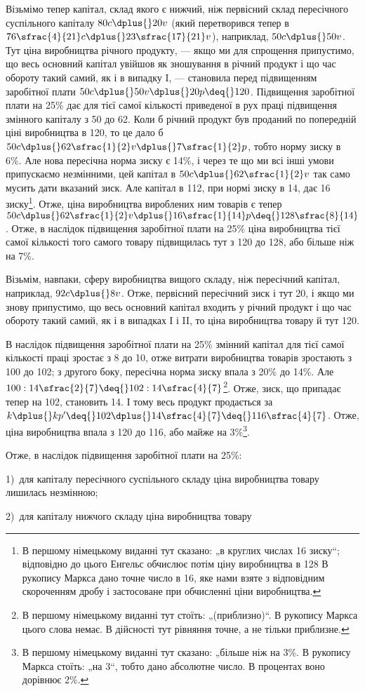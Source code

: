 
Візьмімо тепер капітал, склад якого є нижчий, ніж первісний
склад пересічного суспільного капіталу $80 c \dplus{} 20 v$ (який
перетворився тепер в $76\sfrac{4}{21}c \dplus{} 23\sfrac{17}{21}v$), наприклад, $50 c \dplus{} 50 v$.
Тут ціна виробництва річного продукту, — якщо ми для спрощення
припустимо, що весь основний капітал увійшов як зношування
в річний продукт і що час обороту такий самий, як
і в випадку I, — становила перед підвищенням заробітної плати
$50 c \dplus{} 50 v \dplus{} 20 p \deq{} 120$. Підвищення заробітної плати на 25\%
дає для тієї самої кількості приведеної в рух праці підвищення
змінного капіталу з 50 до 62. Коли б річний продукт був
проданий по попередній ціні виробництва в 120, то це дало б
$50 c \dplus{} 62\sfrac{1}{2}v \dplus{} 7\sfrac{1}{2}p$, тобто норму зиску в 6\%.
Але нова пересічна норма зиску є 14\%, і через те що ми всі інші умови
припускаємо незмінними, цей капітал в $50 c \dplus{} 62\sfrac{1}{2}v$ так само
мусить дати вказаний зиск. Але капітал в 112, при нормі зиску
в 14, дає 16 зиску\footnote*{
В першому німецькому виданні тут сказано: „в круглих числах 16
зиску“; відповідно до цього Енгельс обчислює потім ціну виробництва в 128
В рукопису Маркса дано точне число в 16, яке нами взяте з відповідним
скороченням дробу і застосоване при обчисленні ціни виробництва.
}. Отже, ціна виробництва вироблених
ним товарів є тепер $50 c \dplus{} 62\sfrac{1}{2}v \dplus{} 16\sfrac{1}{14}p \deq{} 128\sfrac{8}{14}$. Отже, в наслідок
підвищення заробітної плати на 25\% ціна виробництва
тієї самої кількості того самого товару підвищилась тут з 120
до 128, або більше ніж на 7\%.

Візьмім, навпаки, сферу виробництва вищого складу, ніж пересічний
капітал, наприклад, $92 c \dplus{} 8 v$. Отже, первісний пересічний
зиск і тут \deq{} 20, і якщо ми знову припустимо, що весь
основний капітал входить у річний продукт і що час обороту
такий самий, як і в випадках І і II, то ціна виробництва товару
й тут \deq{} 120.

В наслідок підвищення заробітної плати на 25\% змінний капітал
для тієї самої кількості праці зростає з 8 до 10, отже
витрати виробництва товарів зростають з 100 до 102; з другого
боку, пересічна норма зиску впала з 20\% до 14\%. Але
$100 : 14\sfrac{2}{7} \deq{} 102 : 14\sfrac{4}{7}$\footnote*{
В першому німецькому виданні тут стоїть: „(приблизно)“. В рукопису
Маркса цього слова немає. В дійсності тут рівняння точне, а не тільки приблизне.
}. Отже, зиск, що припадає тепер на 102,
становить 14. І тому весь продукт продається за
$k \dplus{} kp' \deq{} 102 \dplus{} 14\sfrac{4}{7} \deq{} 116\sfrac{4}{7}$. Отже, ціна виробництва впала
з 120 до 116, або майже на 3\%\footnote*{
В першому німецькому виданні тут сказано: „більше ніж на 3\%. В рукопису
Маркса стоїть: „на 3“, тобто дано абсолютне число. В процентах воно
дорівнює 2\%. 
}.

Отже, в наслідок підвищення заробітної плати на 25\%:

1)~для капіталу пересічного суспільного складу ціна виробництва
товару лишилась незмінною;

2)~для капіталу нижчого складу ціна виробництва товару
\parbreak{}  %
